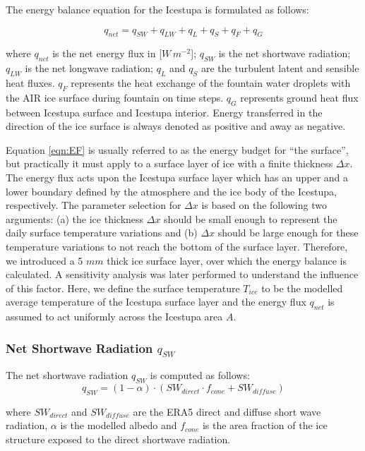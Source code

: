 \documentclass[utf8]{frontiersSCNS} %
\begin{document}
The energy balance equation \citep{Hock_2005} for the Icestupa is formulated as follows:

\begin{equation} q_{net} = q_{SW} + q_{LW} + q_{L} + q_{S} + q_{F} + q_{G} \label{eqn:EF} \end{equation}

where $q_{net}$ is the net energy flux in [$W\,m^{-2}$]; $q_{SW}$ is the net shortwave radiation; $q_{LW}$ is the net
longwave radiation; $q_{L}$ and $q_{S}$ are the turbulent latent and sensible heat fluxes. $q_{F}$ represents the heat
exchange of the fountain water droplets with the AIR ice surface during fountain on time steps. $q_{G}$
represents ground heat flux between Icestupa surface and Icestupa interior. Energy transferred in the direction of the
ice surface is always denoted as positive and away as negative.  

Equation \ref{eqn:EF} is usually referred to as the energy budget for “the surface”, but practically it must apply to
a surface layer of ice with a finite thickness $\Delta x$. The energy flux acts upon the Icestupa surface layer which
has an upper and a lower boundary defined by the atmosphere and the ice body of the Icestupa, respectively. The
parameter selection for $\Delta x$ is based on the following two arguments: (a) the ice thickness $\Delta x$ should be
small enough to represent the daily surface temperature variations and (b) $\Delta x$ should be large enough for these
temperature variations to not reach the bottom of the surface layer.  Therefore, we introduced a 5 $mm$ thick ice
surface layer, over which the energy balance is calculated. A sensitivity analysis was later performed to understand
the influence of this factor. Here, we define the surface temperature $T_{ice}$ to be the modelled average temperature
of the Icestupa surface layer and the energy flux $q_{net}$ is assumed to act uniformly across the Icestupa area $A$.

\subsubsection{Net Shortwave Radiation $q_{SW}$} The net shortwave radiation $q_{SW}$ is computed as follows:
\begin{equation} q_{SW} = (1- \alpha)\cdot (SW_{direct} \cdot f_{cone} + SW_{diffuse}) \label{eqn:SW} \end{equation}

where $SW_{direct}$ and $SW_{diffuse}$ are the ERA5 direct and diffuse short wave radiation, $\alpha$ is the modelled
albedo and $f_{cone}$ is the area fraction of the ice structure exposed to the direct shortwave radiation.
\end{document}
